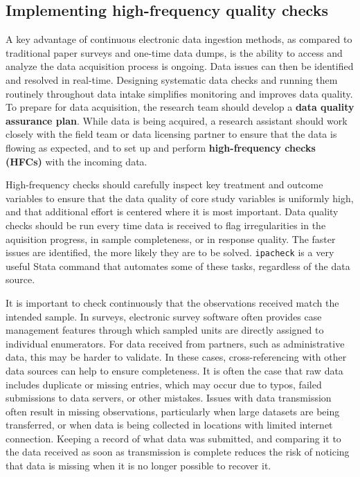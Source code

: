 \subsection{Implementing high-frequency quality checks}

A key advantage of continuous electronic data ingestion methods,
as compared to traditional paper surveys and one-time data dumps,
is the ability to access and analyze the data acquisition process is ongoing.
Data issues can then be identified and resolved in real-time.
Designing systematic data checks and running them routinely throughout data intake
simplifies monitoring and improves data quality.
To prepare for data acquisition,
the research team should develop a \textbf{data quality assurance plan}.
While data is being acquired,
a research assistant should work closely with the field team or data licensing partner
to ensure that the data is flowing as expected,
and to set up and perform \textbf{high-frequency checks (HFCs)} with the incoming data.

High-frequency checks should carefully inspect key treatment and outcome variables
to ensure that the data quality of core study variables is uniformly high,
and that additional effort is centered where it is most important.
Data quality checks should be run every time data is received
to flag irregularities in the aquisition progress, in sample completeness, or in response quality.
The faster issues are identified, the more likely they are to be solved.
\texttt{ipacheck}
is a very useful Stata command that automates some of these tasks,
regardless of the data source.

It is important to check continuously that the observations received match the intended sample.
In surveys, electronic survey software often provides case management features
through which sampled units are directly assigned to individual enumerators.
For data received from partners, such as administrative data,
this may be harder to validate.
In these cases, cross-referencing with other data sources can help to ensure completeness.
It is often the case that raw data includes duplicate or missing entries,
which may occur due to typos, failed submissions to data servers,
or other mistakes.
Issues with data transmission often result in missing observations,
particularly when large datasets are being transferred,
or when data is being collected in locations with limited internet connection.
Keeping a record of what data was submitted,
and comparing it to the data received as soon as transmission is complete
reduces the risk of noticing that data is missing when it is no longer possible to recover it.


